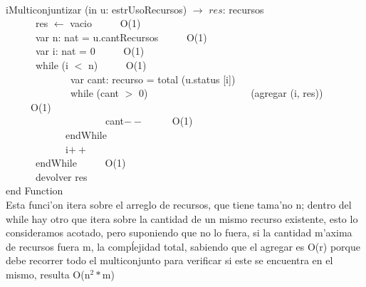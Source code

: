 \documentclass[a4paper,10pt]{article}
\begin{document}
\begin{algoritmo}
\caption{}\\
iMulticonjuntizar (in u: estrUsoRecursos) $\rightarrow$ $res$: recursos \\
	\indent \ \ \ \ \ \  res $\gets$ vacio  \ \ \ \ \ O(1)\\
	\indent \ \ \ \ \ \  var n: nat = u.cantRecursos  \ \ \ \ \ O(1)\\
	\indent \ \ \ \ \ \  var i: nat = 0  \ \ \ \ \ O(1)\\  
	\indent \ \ \ \ \ \  while (i $<$ n)  \ \ \ \ \ O(1)\\
	\indent \ \ \ \ \ \ \ \ \ \ \ \ \ var cant: recurso = total (u.status [i]) \\	
	\indent \ \ \ \ \ \ \ \ \ \ \ \ \ while (cant $>$ 0)
	\indent \ \ \ \ \ \ \ \ \ \ \ \ \ \ \ \ \ \ \ \ (agregar (i, res)) \ \ \ \ \ O(1) \\
	\indent \ \ \ \ \ \ \ \ \ \ \ \ \ \ \ \ \ \ \ \ cant$--$ \ \ \ \ \ O(1) \\
	\indent \ \ \ \ \ \ \ \ \ \ \ \ endWhile \ \ \ \ \ \\
	\indent \ \ \ \ \ \ \ \ \ \ \ \ i$++$ \ \ \ \ \ \\
	\indent \ \ \ \ \ \  endWhile \ \ \ \ \ O(1)\\ 
	\indent \ \ \ \ \ \  devolver res    \\
   end Function \\

Esta funci'on itera sobre el arreglo de recursos, que tiene tama'no n; dentro del while hay otro que itera sobre la cantidad de un mismo recurso existente, esto lo consideramos acotado, pero suponiendo que no lo fuera, si la cantidad m'axima de recursos fuera m, la compĺejidad total, sabiendo que el agregar es O(r) porque debe recorrer todo el multiconjunto para verificar si este se encuentra en el mismo, resulta O(n$^{2}*$m)

\end{algoritmo}
\end{document}
